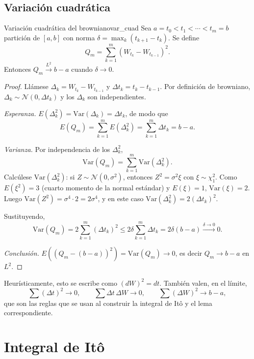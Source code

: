 \documentclass[11pt, a4paper]{article}
\begin{document}
\subsection{Variación cuadrática}

\begin{teorema}{Variación cuadrática del browniano}{var_cuad}
Sea $a = t_0 < t_1 < \cdots < t_m = b$ partición de $[a, b]$ con norma
$\delta = \max_k (t_{k+1} - t_k)$. Se define
$$ Q_m = \sum_{k=1}^m (W_{t_k} - W_{t_{k-1}})^2. $$
Entonces $Q_m \xrightarrow{L^2} b - a$ cuando $\delta \to 0$.
\end{teorema}

\begin{proof}
Llámese $\Delta_k = W_{t_k} - W_{t_{k-1}}$ y $\Delta t_k = t_k - t_{k-1}$. Por definición de
browniano, $\Delta_k \sim \mathcal{N}(0, \Delta t_k)$ y los $\Delta_k$ son independientes.

\textit{Esperanza.} $E(\Delta_k^2) = \mathrm{Var}(\Delta_k) = \Delta t_k$, de modo que
$$ E(Q_m) = \sum_{k=1}^m E(\Delta_k^2) = \sum_{k=1}^m \Delta t_k = b - a. $$

\textit{Varianza.} Por independencia de los $\Delta_k^2$,
$$ \mathrm{Var}(Q_m) = \sum_{k=1}^m \mathrm{Var}(\Delta_k^2). $$
Calcúlese $\mathrm{Var}(\Delta_k^2)$: si $Z \sim \mathcal{N}(0, \sigma^2)$, entonces
$Z^2 = \sigma^2
\xi$ con $\xi \sim \chi^2_1$. Como $E(\xi^2) = 3$ (cuarto momento de la normal estándar) y
$E(\xi) = 1$, $\mathrm{Var}(\xi) = 2$. Luego $\mathrm{Var}(Z^2) = \sigma^4 \cdot 2 = 2 \sigma^4$, y
en este caso $\mathrm{Var}(\Delta_k^2) = 2 (\Delta t_k)^2$.

Sustituyendo,
$$ \mathrm{Var}(Q_m) = 2 \sum_{k=1}^m (\Delta t_k)^2 \le 2 \delta \sum_{k=1}^m \Delta t_k =
2 \delta (b - a) \xrightarrow{\delta \to 0} 0. $$

\textit{Conclusión.} $E((Q_m - (b - a))^2) = \mathrm{Var}(Q_m) \to 0$, es decir $Q_m \to b - a$
en $L^2$.
\end{proof}

\obs Heurísticamente, esto se escribe como $(dW)^2 = dt$. También valen, en el límite,
$$ \sum (\Delta t)^2 \to 0, \qquad \sum \Delta t \, \Delta W \to 0, \qquad \sum (\Delta W)^2 \to b
- a, $$
que son las reglas que se usan al construir la integral de Itô y el lema correspondiente.

\newpage

\section{Integral de Itô}
\end{document}
